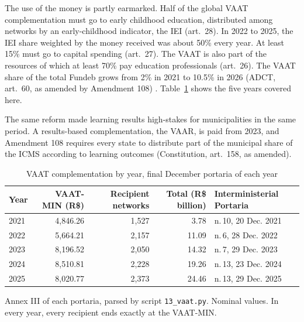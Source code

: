 \documentclass[11pt]{article}
\newcommand{\reais}{R\$}
\begin{document}
The use of the money is partly earmarked. Half of the global VAAT complementation must go to early childhood education, distributed among networks by an early-childhood indicator, the IEI (art.~28). In 2022 to 2025, the IEI share weighted by the money received was about 50\% every year. At least 15\% must go to capital spending (art.~27). The VAAT is also part of the resources of which at least 70\% pay education professionals (art.~26). The VAAT share of the total Fundeb grows from 2\% in 2021 to 10.5\% in 2026 (ADCT, art.~60, as amended by Amendment 108) \citep{tanno2021}. Table~\ref{tab:anos} shows the five years covered here.

The same reform made learning results high-stakes for municipalities in the same period. A results-based complementation, the VAAR, is paid from 2023, and Amendment 108 requires every state to distribute part of the municipal share of the ICMS according to learning outcomes (Constitution, art.~158, as amended).

\begin{table}[h]
\centering
\caption{VAAT complementation by year, final December portaria of each year}\label{tab:anos}
\small
\begin{tabular}{lrrrl}
\toprule
Year & VAAT-MIN (\reais) & Recipient networks & Total (\reais{} billion) & Interministerial Portaria \\
\midrule
2021 & 4,846.26 & 1,527 & 3.78 & n.\,10, 20 Dec. 2021 \\
2022 & 5,664.21 & 2,157 & 11.09 & n.\,6, 28 Dec. 2022 \\
2023 & 8,196.52 & 2,050 & 14.32 & n.\,7, 29 Dec. 2023 \\
2024 & 8,510.81 & 2,228 & 19.26 & n.\,13, 23 Dec. 2024 \\
2025 & 8,020.77 & 2,373 & 24.46 & n.\,13, 29 Dec. 2025 \\
\bottomrule
\end{tabular}

\smallskip
\footnotesize Annex III of each portaria, parsed by script \texttt{13\_vaat.py}. Nominal values. In every year, every recipient ends exactly at the VAAT-MIN.
\end{table}
\end{document}
